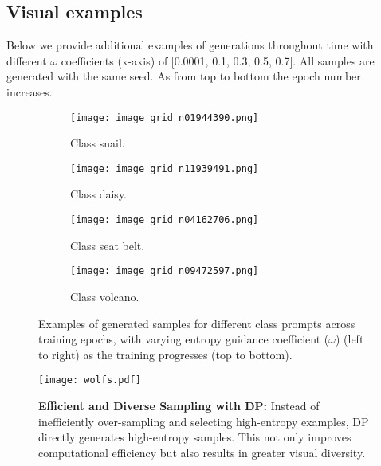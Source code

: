\subsection{Visual examples}
Below we provide additional examples of generations throughout time with different $\omega$ coefficients (x-axis) of [0.0001, 0.1, 0.3, 0.5, 0.7]. All samples are generated with the same seed. As from top to bottom the epoch number increases.
\begin{figure}[h]
    \centering
    \begin{subfigure}{00.48\linewidth}
        \centering
        \texttt{[image: image\_grid\_n01944390.png]}
        \caption{Class snail.}
        \label{fig:subfig1}
    \end{subfigure}
    \hfill
    \begin{subfigure}{00.48\linewidth}
        \centering
        \texttt{[image: image\_grid\_n11939491.png]}
        \caption{Class daisy.}
        \label{fig:subfig5}
    \end{subfigure}
    \vspace{0.5cm}

    \begin{subfigure}{00.48\linewidth}
        \centering
        \texttt{[image: image\_grid\_n04162706.png]}
        \caption{Class seat belt.}
        \label{fig:subfig3}
    \end{subfigure}
    \hfill
    \begin{subfigure}{00.48\linewidth}
        \centering
        \texttt{[image: image\_grid\_n09472597.png]}
        \caption{Class volcano.}
        \label{fig:subfig4}
    \end{subfigure}

    \vspace{0.5cm}

    

    \caption{Examples of generated samples for different class prompts across training epochs, with varying entropy guidance coefficient (\(\omega\)) (left to right) as the training progresses (top to bottom).}

    \label{fig:merged}
\end{figure}

\begin{figure}
    \centering
    \texttt{[image: wolfs.pdf]}
    \caption{\textbf{Efficient and Diverse Sampling with DP:}  Instead of inefficiently over-sampling and selecting high-entropy examples, DP directly generates high-entropy samples. This not only improves computational efficiency but also results in greater visual diversity.}
    \label{fig:wolfs}
\end{figure}

